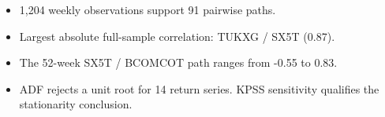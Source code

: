 \begin{itemize}\item 1,204 weekly observations support 91 pairwise paths.\item Largest absolute full-sample correlation: TUKXG / SX5T (0.87).\item The 52-week SX5T / BCOMCOT path ranges from -0.55 to 0.83.\item ADF rejects a unit root for 14 return series. KPSS sensitivity qualifies the stationarity conclusion.\end{itemize}
